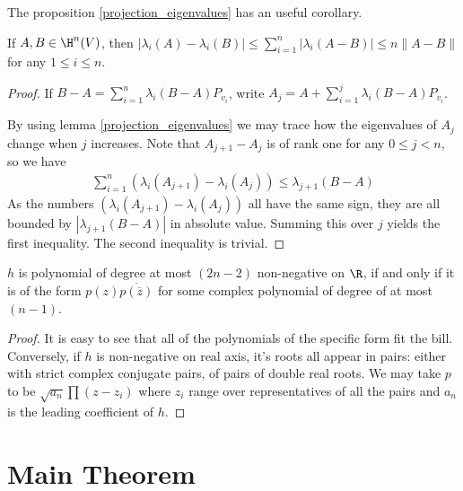 The proposition \ref{projection_eigenvalues} has an useful corollary.

\begin{kor}\label{spectrum_stability}
	If $A, B \in \H^{n}(V)$, then $|\lambda_{i}(A) - \lambda_{i}(B)| \leq \sum_{i = 1}^{n} |\lambda_{i}(A - B)| \leq n \|A - B\|$ for any $1 \leq i \leq n$.
\end{kor}
\begin{proof}
	If $B - A = \sum_{i = 1}^{n} \lambda_{i}(B - A) P_{v_{i}}$, write $A_{j} = A + \sum_{i = 1}^{j} \lambda_{i}(B - A) P_{v_{i}}$.

	By using lemma \ref{projection_eigenvalues} we may trace how the eigenvalues of $A_{j}$ change when $j$ increases. Note that $A_{j + 1} - A_{j}$ is of rank one for any $0 \leq j < n$, so we have
	\begin{align*}
		\sum_{i = 1}^{n} (\lambda_{i}(A_{j + 1}) - \lambda_{i}(A_{j})) \leq \lambda_{j + 1}(B - A)
	\end{align*}
	As the numbers $(\lambda_{i}(A_{j + 1}) - \lambda_{i}(A_{j}))$ all have the same sign, they are all bounded by $|\lambda_{j + 1}(B - A)|$ in absolute value. Summing this over $j$ yields the first inequality. The second inequality is trivial.
\end{proof}

\begin{lem}\label{polynomial_lemma}
	$h$ is polynomial of degree at most $(2 n - 2)$ non-negative on $\R$, if and only if it is of the form $p(z) \overline{p(\overline{z})}$ for some complex polynomial of degree of at most $(n - 1)$.
\end{lem}
\begin{proof}
	It is easy to see that all of the polynomials of the specific form fit the bill. Conversely, if $h$ is non-negative on real axis, it's roots all appear in pairs: either with strict complex conjugate pairs, of pairs of double real roots. We may take $p$ to be $\sqrt{a_{n}}\prod (z - z_{i})$ where $z_{i}$ range over representatives of all the pairs and $a_{n}$ is the leading coefficient of $h$.
\end{proof}

\section{Main Theorem}

